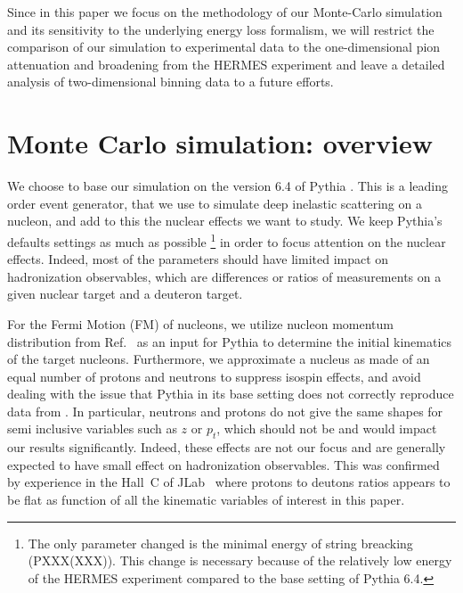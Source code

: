 Since in this paper we focus on the methodology of our Monte-Carlo simulation 
and its sensitivity to the underlying energy loss formalism, we will restrict 
the comparison of our simulation to experimental data to the one-dimensional 
pion attenuation and broadening from the HERMES experiment and leave a 
detailed analysis of two-dimensional binning data to a future efforts.


\section{Monte Carlo simulation: overview}

We choose to base our simulation on the version 6.4 of Pythia 
\cite{Sjostrand:2006za}. This is a leading order event generator, that we use 
to simulate deep inelastic scattering on a nucleon, and add to this the nuclear 
effects we want to study. We keep Pythia's defaults settings as much as 
possible%
\footnote{The only parameter changed is the minimal energy of string breacking (PXXX(XXX)). This change is necessary because of the relatively low energy of the HERMES experiment compared to the base setting of Pythia 6.4.} 
in order to focus attention on the nuclear effects. Indeed, most of the 
parameters should have limited impact on hadronization observables, which are 
differences or ratios of measurements on a given nuclear target and a deuteron 
target. 

For the Fermi Motion (FM) of nucleons, we utilize nucleon momentum distribution 
from Ref.~\cite{CiofidegliAtti:1995qe} as an input for Pythia to determine the 
initial kinematics of the target nucleons. Furthermore, we approximate a 
nucleus as made of an equal number of protons and neutrons to suppress isospin 
effects, and avoid dealing with the issue that Pythia in its base setting does 
not correctly reproduce data from \cite{Asaturyan:2011mq}. In particular, 
neutrons and protons do not give the same shapes for semi inclusive variables 
such as $z$ or $p_t$, which should not be and would impact our results 
significantly. Indeed, these effects are not our focus and are generally 
expected to have small effect on hadronization observables. This was confirmed 
by experience in the Hall~C of JLab~\cite{Asaturyan:2011mq} where protons to 
deutons ratios appears to be flat as function of all the kinematic variables 
of interest in this paper.  

